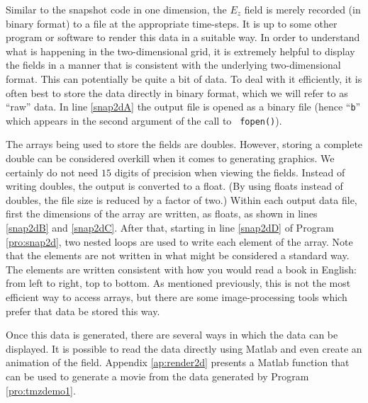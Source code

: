 
Similar to the snapshot code in one dimension, the $E_z$ field is
merely recorded (in binary format) to a file at the appropriate
time-steps.  It is up to some other program or software to render this
data in a suitable way.  In order to understand what is happening in
the two-dimensional grid, it is extremely helpful to display the
fields in a manner that is consistent with the underlying
two-dimensional format.  This can potentially be quite a bit of data.
To deal with it efficiently, it is often best to store the data
directly in binary format, which we will refer to as ``raw'' data.  In
line \ref{snap2dA} the output file is opened as a binary file (hence
``{\tt b}'' which appears in the second argument of the call to {\tt
fopen()}).

The arrays being used to store the fields are doubles.  However,
storing a complete double can be considered overkill when it comes to
generating graphics.  We certainly do not need $15$ digits of
precision when viewing the fields.  Instead of writing doubles, the
output is converted to a float. (By using floats instead of doubles,
the file size is reduced by a factor of two.)  Within each output data
file, first the dimensions of the array are written, as floats, as
shown in lines \ref{snap2dB} and \ref{snap2dC}.  After that, starting
in line \ref{snap2dD} of Program \ref{pro:snap2d}, two nested loops
are used to write each element of the array.  Note that the elements
are not written in what might be considered a standard way.  The
elements are written consistent with how you would read a book in
English: from left to right, top to bottom.  As mentioned previously,
this is not the most efficient way to access arrays, but there are
some image-processing tools which prefer that data be stored this way.

Once this data is generated, there are several ways in which the data
can be displayed.  It is possible to read the data directly using
Matlab and even create an animation of the field.  Appendix
\ref{ap:render2d} presents a Matlab function that can be used to
generate a movie from the data generated by Program \ref{pro:tmzdemo1}.

